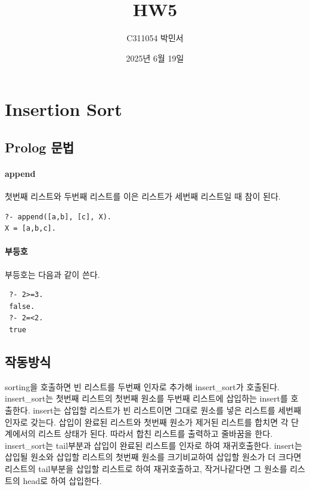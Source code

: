 \documentclass{oblivoir}
\title{HW5}
\author{C311054 박민서}
\date{2025년 6월 19일}
\begin{document}
\maketitle

\section{Insertion Sort}
\subsection{Prolog 문법}
\paragraph*{append}
첫번째 리스트와 두번째 리스트를 이은 리스트가 세번째 리스트일 때 참이 된다.
\begin{verbatim}
?- append([a,b], [c], X).
X = [a,b,c].
\end{verbatim}

\paragraph*{부등호}
 부등호는 다음과 같이 쓴다.
 \begin{verbatim}
 ?- 2>=3.
 false.
 ?- 2=<2.
 true
 \end{verbatim}

\subsection{작동방식}

sorting을 호출하면 빈 리스트를 두번째 인자로 추가해 insert\_sort가 호출된다.
insert\_sort는 첫번째 리스트의 첫번째 원소를 두번째 리스트에 삽입하는 insert를 호출한다. insert는 삽입할 리스트가 빈 리스트이면 그대로 원소를 넣은 리스트를 세번째 인자로 갖는다. 삽입이 완료된 리스트와 첫번째 원소가 제거된 리스트를 합치면 각 단계에서의 리스트 상태가 된다. 따라서 합친 리스트를 출력하고 줄바꿈을 한다. insert\_sort는 tail부분과 삽입이 완료된 리스트를 인자로 하여 재귀호출한다. insert는 삽입될 원소와 삽입할 리스트의 첫번째 원소를 크기비교하여 삽입할 원소가 더 크다면 리스트의 tail부분을 삽입할 리스트로 하여 재귀호출하고, 작거나같다면 그 원소를 리스트의 head로 하여 삽입한다.
\end{document}
